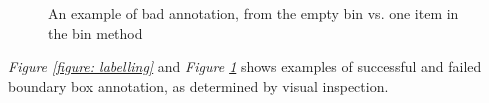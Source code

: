 \begin{figure}[h]
    \centering
    \hspace{0.5cm}
    \hspace{0.5cm}
    \hspace{0.5cm}
    \caption{An example of bad annotation, from the empty bin vs. one item in the bin method}
    \label{figure: badlabelling}
\end{figure}
\textit{Figure \ref{figure: labelling}} and \textit{Figure \ref{figure: badlabelling}} shows examples of successful and failed boundary box annotation, as determined by visual inspection. 

\clearpage

